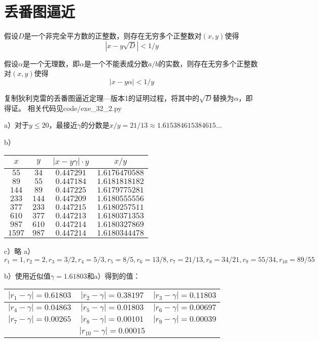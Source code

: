 \chapter{丢番图逼近}
\begin{theorem}[狄利克雷的丢番图逼近定理---版本1]
假设$D$是一个非完全平方数的正整数，则存在无穷多个正整数对$(x,y)$使得
\[|x-y\sqrt D|<1/y\]
\end{theorem}
\begin{theorem}[狄利克雷的丢番图逼近定理---版本2]
假设$\alpha$是一个无理数，即$\alpha$是一个不能表成分数$a/b$的实数，则存在无穷多个正整数对$(x,y)$使得
\[|x-y\alpha|<1/y\]
\end{theorem}
%
\exercise 复制狄利克雷的丢番图逼近定理---版本1的证明过程，将其中的$\sqrt D$替换为$\alpha$，即得证。
%
\exercise 相关代码见code/exe\_32\_2.py\par
a）对于$y\le20$，最接近$\gamma$的分数是$x/y=21/13\approx1.615384615384615\dots$\par
b）\begin{center}
\begin{tabular}{|c|c|c|c|}
\hline
$x$ & $y$ & $|x-y\gamma|\cdot y$ & $x/y$ \\
\hline 
\hline
$55$ & $34$ & $0.447291$ & $1.6176470588$ \\
\hline
$89$ & $55$ & $0.447184$ & $1.6181818182$ \\
\hline
$144$ & $89$ & $0.447225$ & $1.6179775281$ \\
\hline
$233$ & $144$ & $0.447209$ & $1.6180555556$ \\
\hline
$377$ & $233$ & $0.447215$ & $1.6180257511$ \\
\hline
$610$ & $377$ & $0.447213$ & $1.6180371353$ \\
\hline
$987$ & $610$ & $0.447214$ & $1.6180327869$ \\
\hline
$1597$ & $987$ & $0.447214$ & $1.6180344478$ \\
\hline
\end{tabular}
\end{center}
c）略
%
\exercise a）$r_1=1,r_2=2,r_3=3/2,r_4=5/3,r_5=8/5,r_6=13/8,r_7=21/13,r_8=34/21,r_9=55/34,r_{10}=89/55$\par
b）使用近似值$\gamma=1.61803$和a）得到的值：
\begin{center}
\begin{tabular}{|c|c|c|}
\hline
$|r_1-\gamma|=0.61803$ & $|r_2-\gamma|=0.38197$ & $|r_3-\gamma|=0.11803$ \\
\hline 
$|r_4-\gamma|=0.04863$ & $|r_5-\gamma|=0.01803$ & $|r_6-\gamma|=0.00697$ \\
\hline
$|r_7-\gamma|=0.00265$ & $|r_8-\gamma|=0.00101$ & $|r_9-\gamma|=0.00039$ \\
\hline
 & $|r_{10}-\gamma|=0.00015$  \\
\hline
\end{tabular}
\end{center}
